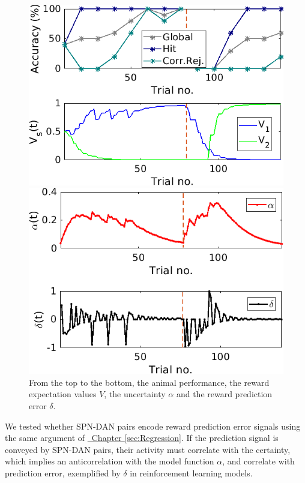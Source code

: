\begin{figure}
    \centering
    \includegraphics[scale=0.7]{figures/PavPerfV.png}
    
    \vspace{0.5cm}
    
    \includegraphics[scale=0.7]{figures/PavAlphaDelta.png}
    \caption{From the top to the bottom, the animal performance, the reward expectation values $V$, the uncertainty $\alpha$ and the reward prediction error $\delta$.}
    \label{fig:PavRL_ex}
\end{figure}
We tested whether SPN-DAN pairs encode reward prediction error signals using the same argument of \hyperref[sec:Regression]{~Chapter \ref*{sec:Regression}}. If the prediction signal is conveyed by SPN-DAN pairs, their activity must correlate with the certainty, which implies an anticorrelation with the model function $\alpha$, and correlate with prediction error, exemplified by $\delta$ in reinforcement learning models.\\
